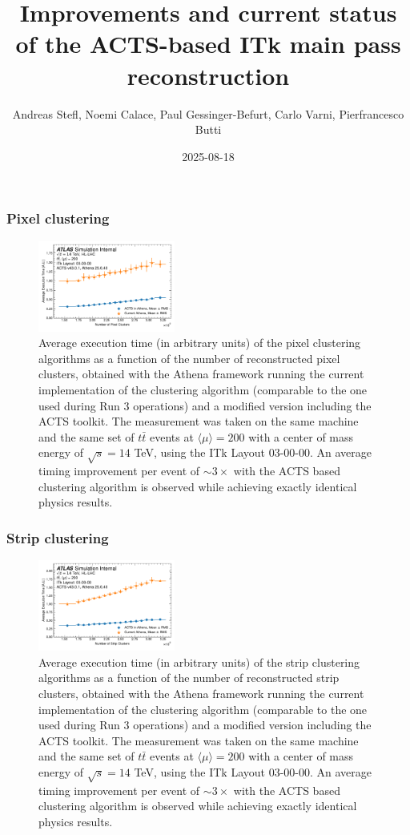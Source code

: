 \documentclass[aspectratio=169]{beamer}
\title{Improvements and current status of the ACTS-based ITk main pass reconstruction}
\author{Andreas Stefl, Noemi Calace, Paul Gessinger-Befurt, Carlo Varni, Pierfrancesco Butti}
\institute{CERN}
\date{2025-08-18}
\begin{document}
\frame{\titlepage}

\begin{frame}
\frametitle{Pixel clustering}
\begin{figure}[h]
    \centering
    \includegraphics[width=0.4\textwidth]{plots/clustering_pixel.pdf}
    \caption{Average execution time (in arbitrary units) of the pixel clustering algorithms as a function of the number of reconstructed pixel clusters, obtained with the Athena framework running the current implementation of the clustering algorithm (comparable to the one used during Run 3 operations) and a modified version including the ACTS toolkit. The measurement was taken on the same machine and the same set of $t\bar{t}$ events at $\langle \mu \rangle = 200$ with a center of mass energy of $\sqrt{s}=14$ TeV, using the ITk Layout 03-00-00. An average timing improvement per event of $\sim3\times$ with the ACTS based clustering algorithm is observed while achieving exactly identical physics results.}
\end{figure}
\end{frame}

\begin{frame}
\frametitle{Strip clustering}
\begin{figure}[h]
    \centering
    \includegraphics[width=0.4\textwidth]{plots/clustering_strip.pdf}
    \caption{Average execution time (in arbitrary units) of the strip clustering algorithms as a function of the number of reconstructed strip clusters, obtained with the Athena framework running the current implementation of the clustering algorithm (comparable to the one used during Run 3 operations) and a modified version including the ACTS toolkit. The measurement was taken on the same machine and the same set of $t\bar{t}$ events at $\langle \mu \rangle = 200$ with a center of mass energy of $\sqrt{s}=14$ TeV, using the ITk Layout 03-00-00. An average timing improvement per event of $\sim3\times$ with the ACTS based clustering algorithm is observed while achieving exactly identical physics results.}
\end{figure}
\end{frame}
\end{document}
